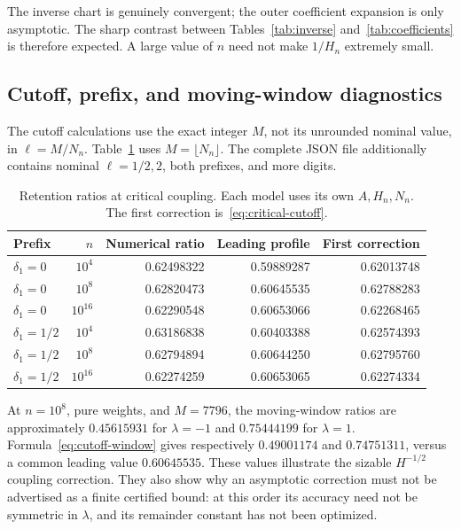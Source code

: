 \documentclass[11pt,a4paper]{article}
\numberwithin{equation}{section}
\theoremstyle{definition}
\theoremstyle{remark}
\begin{document}
The inverse chart is genuinely convergent; the outer coefficient expansion
is only asymptotic. The sharp contrast between Tables~\ref{tab:inverse}
and~\ref{tab:coefficients} is therefore expected. A large value of \(n\)
need not make \(1/H_n\) extremely small.

\subsection{Cutoff, prefix, and moving-window diagnostics}
The cutoff calculations use the exact integer \(M\), not its unrounded
nominal value, in \(\ell=M/N_n\). Table~\ref{tab:cutoff} uses
\(M=\lfloor N_n\rfloor\). The complete JSON file additionally contains
nominal \(\ell=1/2,2\), both prefixes, and more digits.

\begin{table}[htbp]
\centering\small
\begin{tabular}{@{}lrrrr@{}}
\toprule
Prefix&\(n\)&Numerical ratio&Leading profile&First correction\\
\midrule
\(\delta_1=0\)&\(10^4\)&0.62498322&0.59889287&0.62013748\\
\(\delta_1=0\)&\(10^8\)&0.62820473&0.60645535&0.62788283\\
\(\delta_1=0\)&\(10^{16}\)&0.62290548&0.60653066&0.62268465\\
\(\delta_1=1/2\)&\(10^4\)&0.63186838&0.60403388&0.62574393\\
\(\delta_1=1/2\)&\(10^8\)&0.62794894&0.60644250&0.62795760\\
\(\delta_1=1/2\)&\(10^{16}\)&0.62274259&0.60653065&0.62274334\\
\bottomrule
\end{tabular}
\caption{Retention ratios at critical coupling. Each model uses its own
\(A,H_n,N_n\). The first correction is~\eqref{eq:critical-cutoff}.}
\label{tab:cutoff}
\end{table}

At \(n=10^8\), pure weights, and \(M=7796\), the moving-window ratios are
approximately \(0.45615931\) for \(\lambda=-1\) and \(0.75444199\) for
\(\lambda=1\). Formula~\eqref{eq:cutoff-window} gives respectively
\(0.49001174\) and \(0.74751311\), versus a common leading value
\(0.60645535\). These values illustrate the sizable
\(H^{-1/2}\) coupling correction. They also show why an asymptotic correction
must not be advertised as a finite certified bound: at this order its
accuracy need not be symmetric in \(\lambda\), and its remainder constant
has not been optimized.
\end{document}
